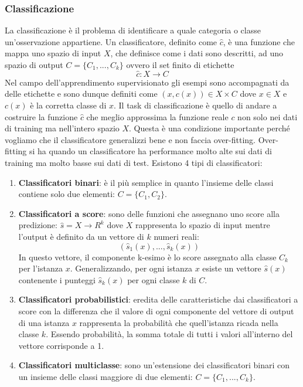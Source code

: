 \subsubsection{Classificazione}
La classificazione è il problema di identificare a quale categoria o classe un'osservazione appartiene. Un classificatore, definito come \(\hat{c}\), è una funzione che mappa uno spazio di input \(X\), che definisce come i dati sono descritti, ad uno spazio di output \(C=\{C_1,...,C_k\}\) ovvero il set finito di etichette
\[\hat{c}: X \rightarrow C\]
Nel campo dell'apprendimento supervisionato gli esempi sono accompagnati da delle etichette e sono dunque definiti come \((x,c(x))\in X\times C\) dove \(x \in X\) e \(c(x)\) è la corretta classe di \(x\). Il task di classificazione è quello di andare a costruire la funzione \(\hat{c}\) che meglio approssima la funzione reale \(c\) non solo nei dati di training ma nell'intero spazio \(X\). Questa è una condizione importante perché vogliamo che il classificatore generalizzi bene e non faccia over-fitting. Over-fitting si ha quando un classificatore ha performance molto alte sui dati di training ma molto basse sui dati di test.
Esistono 4 tipi di classificatori:
\begin{enumerate}
\item \textbf{Classificatori binari}: è il più semplice in quanto l'insieme delle classi contiene solo due elementi: \(C=\{C_1,C_2\}\).
\item \textbf{Classificatori a score}: sono delle funzioni che assegnano uno score alla predizione: \(\hat{s} = X\rightarrow R^k\) dove \(X\) rappresenta lo spazio di input mentre l'output è definito da un vettore di \(k\) numeri reali: 
\[(\hat{s}_1 (x),...,\hat{s}_k(x))\]
In questo vettore, il componente k-esimo è lo score assegnato alla classe \(C_k\) per l'istanza \(x\). Generalizzando, per ogni istanza \(x\) esiste un vettore \(\hat{s}(x)\) contenente i punteggi \(\hat{s}_k(x)\) per ogni classe \(k\) di \(C\).
\item \textbf{Classificatori probabilistici}: eredita delle caratteristiche dai classificatori a score con la differenza che il valore di ogni componente del vettore di output di una istanza \(x\) rappresenta la probabilità che quell'istanza ricada nella classe \(k\). Essendo probabilità, la somma totale di tutti i valori all'interno del vettore corrisponde a 1.
\item \textbf{Classificatori multiclasse}: sono un'estensione dei classificatori binari con un insieme delle classi maggiore di due elementi: \(C=\{C_1,...,C_k\}\). 
\end{enumerate}

